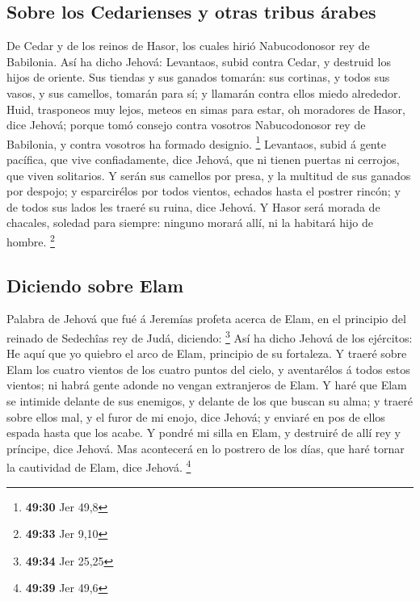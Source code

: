 \hypertarget{sobre-los-cedarienses-y-otras-tribus-uxe1rabes}{%
\subsection{Sobre los Cedarienses y otras tribus
árabes}\label{sobre-los-cedarienses-y-otras-tribus-uxe1rabes}}

 De Cedar y de los reinos de Hasor, los cuales hirió
Nabucodonosor rey de Babilonia. Así ha dicho Jehová: Levantaos, subid
contra Cedar, y destruid los hijos de oriente.  Sus tiendas
y sus ganados tomarán: sus cortinas, y todos sus vasos, y sus camellos,
tomarán para sí; y llamarán contra ellos miedo alrededor. 
Huid, trasponeos muy lejos, meteos en simas para estar, oh moradores de
Hasor, dice Jehová; porque tomó consejo contra vosotros Nabucodonosor
rey de Babilonia, y contra vosotros ha formado designio. \footnote{\textbf{49:30}
  Jer 49,8}  Levantaos, subid á gente pacífica, que vive
confiadamente, dice Jehová, que ni tienen puertas ni cerrojos, que viven
solitarios.  Y serán sus camellos por presa, y la multitud
de sus ganados por despojo; y esparcirélos por todos vientos, echados
hasta el postrer rincón; y de todos sus lados les traeré su ruina, dice
Jehová.  Y Hasor será morada de chacales, soledad para
siempre: ninguno morará allí, ni la habitará hijo de hombre. \footnote{\textbf{49:33}
  Jer 9,10}

\hypertarget{diciendo-sobre-elam}{%
\subsection{Diciendo sobre Elam}\label{diciendo-sobre-elam}}

 Palabra de Jehová que fué á Jeremías profeta acerca de
Elam, en el principio del reinado de Sedechîas rey de Judá, diciendo:
\footnote{\textbf{49:34} Jer 25,25}  Así ha dicho Jehová de
los ejércitos: He aquí que yo quiebro el arco de Elam, principio de su
fortaleza.  Y traeré sobre Elam los cuatro vientos de los
cuatro puntos del cielo, y aventarélos á todos estos vientos; ni habrá
gente adonde no vengan extranjeros de Elam.  Y haré que
Elam se intimide delante de sus enemigos, y delante de los que buscan su
alma; y traeré sobre ellos mal, y el furor de mi enojo, dice Jehová; y
enviaré en pos de ellos espada hasta que los acabe.  Y
pondré mi silla en Elam, y destruiré de allí rey y príncipe, dice
Jehová.  Mas acontecerá en lo postrero de los días, que
haré tornar la cautividad de Elam, dice Jehová. \footnote{\textbf{49:39}
  Jer 49,6}

